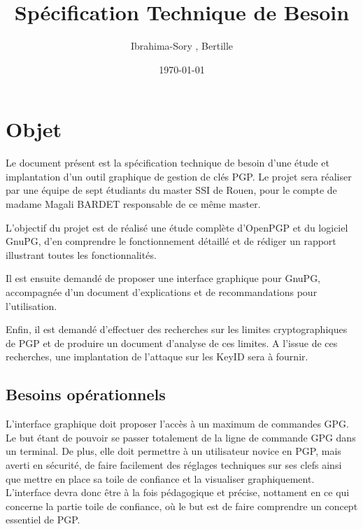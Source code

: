 \documentclass{../res/univ-projet}
\title{Spécification Technique de Besoin}
\author{Ibrahima-Sory \bsc{Barry}, Bertille \bsc{Bouillie}}
\date{\today}
\begin{document}
\maketitle
\newpage
\tableofcontents
\newpage

\section{Objet}

Le document présent est la spécification technique de besoin d'une étude et implantation d'un outil graphique de gestion de clés PGP. 
Le projet sera réaliser par une équipe de sept étudiants du master SSI de Rouen, pour le compte de madame Magali BARDET responsable 
de ce même master. 

L'objectif du projet est de réalisé une étude complète d'OpenPGP et du logiciel GnuPG, d'en comprendre le fonctionnement détaillé et 
de rédiger un rapport illustrant toutes les fonctionnalités.

Il est ensuite demandé de proposer une interface graphique pour GnuPG, accompagnée d'un document d'explications et de recommandations pour 
l'utilisation.

Enfin, il est demandé d'effectuer des recherches sur les limites cryptographiques de PGP et de produire un document d'analyse de ces limites.
A l'issue de ces recherches, une implantation de l'attaque sur les KeyID sera à fournir.

\subsection{Besoins opérationnels}
L'interface graphique doit proposer l'accès à un maximum de commandes GPG. Le but étant de pouvoir se passer totalement de la ligne de commande 
GPG dans un terminal. De plus, elle doit permettre à un utilisateur novice en PGP, mais averti en sécurité, de faire facilement des réglages 
techniques sur ses clefs ainsi que mettre en place sa toile de confiance et la visualiser graphiquement. L'interface devra donc être à 
la fois pédagogique et précise, nottament en ce qui concerne la partie toile de confiance, où le but est de faire comprendre un concept 
essentiel de PGP.
\end{document}
